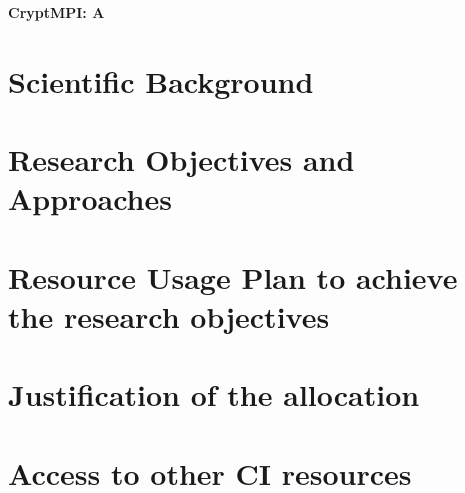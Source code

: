 \centerline{\Large\bfseries CryptMPI: A}

\section{Scientific Background}


\section{Research Objectives and Approaches}

\section{Resource Usage Plan to achieve the research objectives}

\section{Justification of the allocation}

\section{Access to other CI resources}

